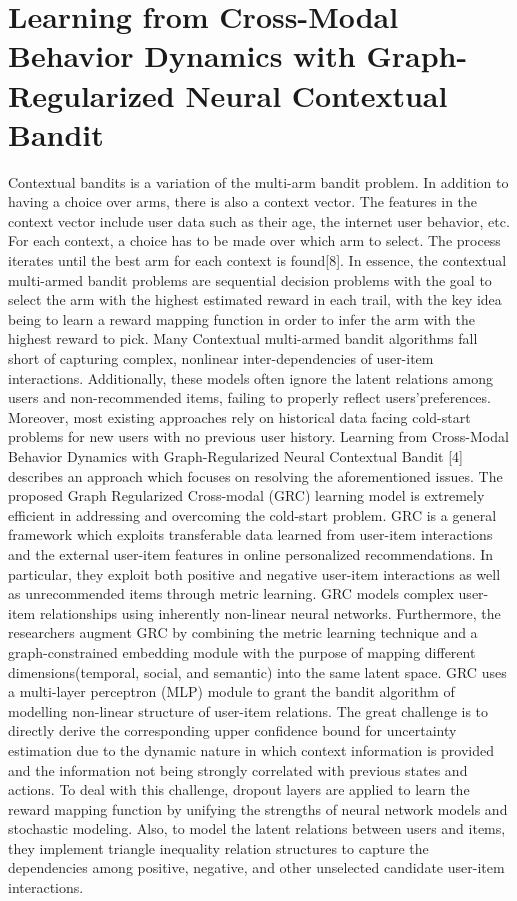 \section {Learning from Cross-Modal Behavior Dynamics with
Graph-Regularized Neural Contextual Bandit}

Contextual bandits is a variation of the multi-arm bandit problem. In addition to having a choice over arms, there is also a context vector. The features in the context vector include user data such as their age, the internet user behavior, etc. For each context, a choice has to be made over which arm to select. The process iterates until the best arm for each context is found[8]. In essence, the contextual multi-armed bandit problems are sequential decision problems with the goal to select the arm with the highest estimated reward in each trail, with the key idea being to learn a reward mapping function in order to infer the arm with the highest reward to pick. Many Contextual multi-armed bandit algorithms fall short of capturing complex, nonlinear inter-dependencies of user-item interactions. Additionally, these models often ignore the latent relations among users and non-recommended items, failing to properly reflect users’preferences. Moreover, most existing approaches rely on historical data facing cold-start problems for new users with no previous user history. Learning from Cross-Modal Behavior Dynamics with Graph-Regularized Neural Contextual Bandit [4] describes an approach which focuses on resolving the aforementioned issues. The proposed Graph Regularized Cross-modal (GRC) learning model is extremely efficient in addressing and overcoming the cold-start problem. GRC is a general framework which exploits transferable data learned from user-item interactions and the external user-item features in online personalized recommendations. In particular, they exploit both positive and negative user-item interactions as well as unrecommended items through metric learning. GRC models complex user-item relationships using inherently non-linear neural networks. Furthermore, the researchers augment GRC by combining the metric learning technique and a graph-constrained embedding module with the purpose of mapping different dimensions(temporal, social, and semantic) into the same latent space. GRC uses a multi-layer perceptron (MLP) module to grant the bandit algorithm of modelling non-linear structure of user-item relations. The great challenge is to directly derive the corresponding upper confidence bound for uncertainty estimation due to the dynamic nature in which context information is provided and the information not being strongly correlated with previous states and actions. To deal with this challenge, dropout layers are applied to learn the reward mapping function by unifying the strengths of neural network models and stochastic modeling. Also, to model the latent relations between users and items, they implement triangle inequality relation structures to capture the dependencies among positive, negative, and other unselected candidate user-item interactions. 
